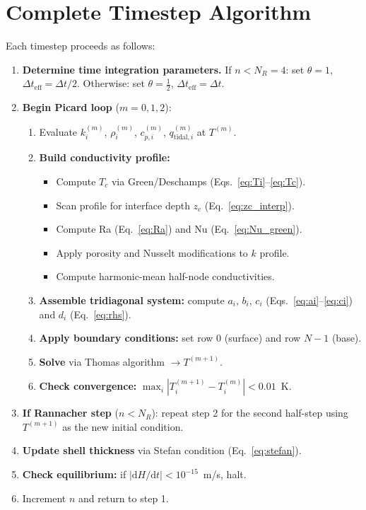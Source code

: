 \documentclass[11pt,a4paper]{article}
\newcommand{\dd}{\mathrm{d}}
\newcommand{\half}{\tfrac{1}{2}}
\begin{document}
\section{Complete Timestep Algorithm}
\label{sec:algorithm}

Each timestep proceeds as follows:

\begin{enumerate}[leftmargin=2em]
\item \textbf{Determine time integration parameters.}
  If $n < N_R = 4$: set $\theta = 1$, $\Delta t_{\mathrm{eff}} = \Delta t/2$.
  Otherwise: set $\theta = \half$, $\Delta t_{\mathrm{eff}} = \Delta t$.

\item \textbf{Begin Picard loop} ($m = 0, 1, 2$):
  \begin{enumerate}
  \item Evaluate $k^{(m)}_i$, $\rho^{(m)}_i$, $c_{p,i}^{(m)}$,
        $q_{\mathrm{tidal},i}^{(m)}$ at $T^{(m)}$.
  \item \textbf{Build conductivity profile:}
    \begin{itemize}
    \item Compute $T_c$ via Green/Deschamps (Eqs.~\ref{eq:Ti}--\ref{eq:Tc}).
    \item Scan profile for interface depth $z_c$ (Eq.~\ref{eq:zc_interp}).
    \item Compute Ra (Eq.~\ref{eq:Ra}) and Nu (Eq.~\ref{eq:Nu_green}).
    \item Apply porosity and Nusselt modifications to $k$ profile.
    \item Compute harmonic-mean half-node conductivities.
    \end{itemize}
  \item \textbf{Assemble tridiagonal system:}
    compute $a_i$, $b_i$, $c_i$ (Eqs.~\ref{eq:ai}--\ref{eq:ci})
    and $d_i$ (Eq.~\ref{eq:rhs}).
  \item \textbf{Apply boundary conditions:} set row 0 (surface) and
        row $N{-}1$ (base).
  \item \textbf{Solve} via Thomas algorithm $\to T^{(m+1)}$.
  \item \textbf{Check convergence:}
        $\max_i |T_i^{(m+1)} - T_i^{(m)}| < 0.01$~K.
  \end{enumerate}

\item \textbf{If Rannacher step} ($n < N_R$): repeat step 2 for the
      second half-step using $T^{(m+1)}$ as the new initial condition.

\item \textbf{Update shell thickness} via Stefan condition
      (Eq.~\ref{eq:stefan}).

\item \textbf{Check equilibrium:} if $|\dd H/\dd t| < 10^{-15}$~m/s, halt.

\item Increment $n$ and return to step 1.
\end{enumerate}
\end{document}
